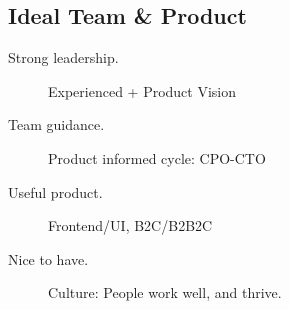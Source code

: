\subsection*{%
Ideal Team \& Product
}

\begin{description}
 \item[Strong leadership.] Experienced + Product Vision
  \item[Team guidance.] Product informed cycle: CPO-CTO
 \item[Useful product.] Frontend/UI, B2C/B2B2C %
  \item[Nice to have.] Culture: People work well, and thrive. %
\end{description}




% 










%

